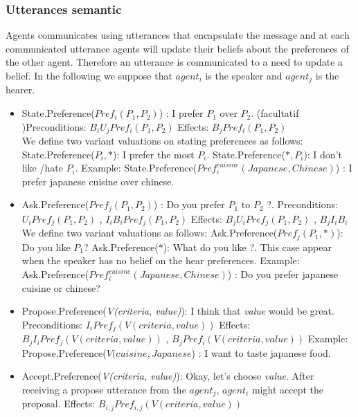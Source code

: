 \documentclass{llncs}
\begin{document}
\subsubsection{Utterances semantic}
Agents communicates using utterances that encapsulate the message and at each communicated utterance agents will update their beliefs about the preferences of the other agent. Therefore an utterance is communicated to a need to update a belief. In the following we suppose that $agent_{i}$ is the speaker and $agent_{j}$ is the hearer. 
 \begin{itemize}
 \item State.Preference(\textit{$Pref_{i}(P_{1}, P_{2})$}) : I prefer $P_{1}$ over $P_{2}$.
 \subitem (facultatif )Preconditions:  $ B_{i} U_{j} Pref_{i}(P_{1}, P_{2})$
 \subitem Effects: $ B_{j} Pref_{i}(P_{1}, P_{2})$
 \\ We define two variant valuations on stating preferences as follows: 
 \subitem State.Preference(\textit{$P_{i}, *$}): I prefer the most $P_{i}$.
 \subitem State.Preference(\textit{$*, P_{i}$}): I don't like /hate $P_{i}$.
\subitem Example: State.Preference(\textit{$Pref_{i}^{cuisine} (Japanese , Chinese)$}) : I prefer japanese cuisine over chinese.
 \item Ask.Preference(\textit{$Pref_{j}(P_{1}, P_{2})$}) : Do you prefer $P_{1}$ to $P_{2}$ ?. 
  \subitem Preconditions:  $ U_{i} Pref_{j}(P_{1}, P_{2})$ ,  $ I_{i} B_{i} Pref_{j}(P_{1}, P_{2})$
  \subitem Effects:  $B_{j} U_{i} Pref_{j}(P_{1}, P_{2})$ ,  $ B_{j} I_{i} B_{i}$
 \\We define two variant valuations as follows: 
 \subitem Ask.Preference(\textit{$Pref_{j}(P_{1}, *)$}): Do you like $P_{1}$?
 \subitem Ask.Preference(\textit{$*$}): What do you like ?. This case appear when the speaker has no belief on the hear preferences. 
 \subitem Example: Ask.Preference(\textit{$Pref_{i}^{cuisine} (Japanese , Chinese)$}) : Do you prefer japanese cuisine or chinese?
 
 \item Propose.Preference(\textit{V(criteria, value)}): I think that \textit{value}  would be great. 
  \subitem Preconditions:  $ I_{i} Pref_{j}(V(criteria, value))$
  \subitem Effects:  $B_{j} I_{i} Pref_{j}(V(criteria, value))$ ,  $ B_{j} Pref_{i}(V(criteria, value))$
   \subitem Example: Propose.Preference(\textit{$V(cuisine,Japanese$}) : I want to taste japanese food.
 \item Accept.Preference(\textit{V(criteria, value)}): Okay, let's choose \textit{value}. After receiving a propose utterance from the $agent_{j}$,  $agent_{i}$ might accept the proposal.
   \subitem Effects:  $B_{i,j} Pref_{i,j}(V(criteria, value))$
   

\end{itemize}
\end{document}
